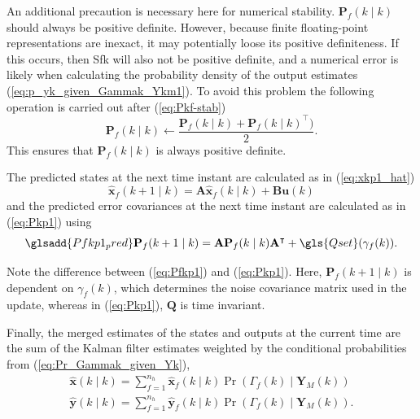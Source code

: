 An additional precaution is necessary here for numerical stability. $\mathbf{P}_f(k \mid k)$ should always be positive definite. However, because finite floating-point representations are inexact, it may potentially loose its positive definiteness. If this occurs, then \gls{Sfk} will also not be positive definite, and a numerical error is likely when calculating the probability density of the output estimates (\ref{eq:p_yk_given_Gammak_Ykm1}). To avoid this problem the following operation is carried out after (\ref{eq:Pkf-stab})
\begin{equation} \label{eq:Pkf-psd-fix}
	\mathbf{P}_f(k \mid k) \gets \frac{ \mathbf{P}_f(k \mid k) + \mathbf{P}_f(k \mid k)^\intercal )}{2}. 
\end{equation}
This ensures that $\mathbf{P}_f(k \mid k)$ is always positive definite.

The predicted states at the next time instant are calculated as in (\ref{eq:xkp1_hat})
\begin{equation} \label{eq:xfkp1_hat}
	\mathbf{\hat{x}}_f(k+1 \mid k) = \mathbf{A} \mathbf{\hat{x}}_f(k \mid k) + \mathbf{B} \mathbf{u}(k)
\end{equation}
and the predicted error covariances at the next time instant are calculated as in (\ref{eq:Pkp1}) using
\begin{equation} \label{eq:Pfkp1} \glsadd{Pfkp1_pred}
	\mathbf{P}_f(k+1 \mid k) = \mathbf{A} \mathbf{P}_f(k \mid k)  \mathbf{A}^\intercal  + \gls{Qset}(\gamma_f(k)).
\end{equation}

Note the difference between (\ref{eq:Pfkp1}) and (\ref{eq:Pkp1}).  Here, $\mathbf{P}_f(k+1 \mid k)$ is dependent on $\gamma_f(k)$, which determines the noise covariance matrix used in the update, whereas in (\ref{eq:Pkp1}), $\mathbf{Q}$ is time invariant.

Finally, the merged estimates of the states and outputs at the current time are the sum of the Kalman filter estimates weighted by the conditional probabilities from (\ref{eq:Pr_Gammak_given_Yk}),
\begin{equation} \label{eq:xkyk_hat_MKF}
	\begin{aligned}
		\mathbf{\hat{x}}(k \mid k) = \sum_{f=1}^{n_h} \mathbf{\hat{x}}_f(k \mid k) \Pr(\Gamma_f(k) \mid \mathbf{Y}_M(k)) \\
		\mathbf{\hat{y}}(k \mid k) = \sum_{f=1}^{n_h} \mathbf{\hat{y}}_f(k \mid k) \Pr(\Gamma_f(k) \mid \mathbf{Y}_M(k)).
	\end{aligned}
\end{equation}

